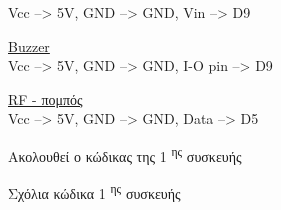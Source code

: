\documentclass[twoside,a4paper]{article}
\newcommand\tab[1][1cm]{\hspace*{#1}}
\begin{document}
 \tab\hspace{1.5mm} Vcc --> 5V, GND --> GND, Vin --> D9\\
  \par\textendash\hspace{0.5mm} \underline{ Buzzer} \\
 
 \tab\hspace{1.5mm} Vcc --> 5V, GND --> GND, Ι-Ο pin --> D9\\
 \par\textendash\hspace{0.5mm} \underline{ RF - πομπός} \\
 
 \tab\hspace{1.5mm} Vcc --> 5V, GND --> GND, Data --> D5\\
 \newpage
 {\large \begin{center} Ακολουθεί ο κώδικας της 1 \textsuperscript{ης} συσκευής \end{center}}
 
 \newpage
 {\large \begin{center} Σχόλια κώδικα 1 \textsuperscript{ης} συσκευής\end{center}}
\end{document}

